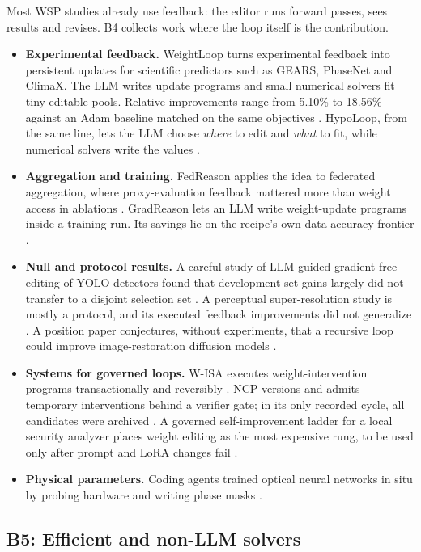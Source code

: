 Most WSP studies already use feedback: the editor runs forward passes, sees results and revises. B4 collects work where the loop itself is the contribution.
\begin{itemize}[leftmargin=*,itemsep=2pt]
\item \textbf{Experimental feedback.} WeightLoop turns experimental feedback into persistent updates for scientific predictors such as GEARS, PhaseNet and ClimaX. The LLM writes update programs and small numerical solvers fit tiny editable pools. Relative improvements range from 5.10\% to 18.56\% against an Adam baseline matched on the same objectives \citep{ax2611_07319}. HypoLoop, from the same line, lets the LLM choose \emph{where} to edit and \emph{what} to fit, while numerical solvers write the values \citep{ax2611_23718}.
\item \textbf{Aggregation and training.} FedReason applies the idea to federated aggregation, where proxy-evaluation feedback mattered more than weight access in ablations \citep{ax2611_08383}. GradReason lets an LLM write weight-update programs inside a training run. Its savings lie on the recipe's own data-accuracy frontier \citep{ax2611_11005}.
\item \textbf{Null and protocol results.} A careful study of LLM-guided gradient-free editing of YOLO detectors found that development-set gains largely did not transfer to a disjoint selection set \citep{ax2611_17789}. A perceptual super-resolution study is mostly a protocol, and its executed feedback improvements did not generalize \citep{ax2611_18690}. A position paper conjectures, without experiments, that a recursive loop could improve image-restoration diffusion models \citep{ax2611_04268}.
\item \textbf{Systems for governed loops.} W-ISA executes weight-intervention programs transactionally and reversibly \citep{ax2611_13232}. NCP versions and admits temporary interventions behind a verifier gate; in its only recorded cycle, all candidates were archived \citep{ax2611_13236}. A governed self-improvement ladder for a local security analyzer places weight editing as the most expensive rung, to be used only after prompt and LoRA changes fail \citep{ax2611_10425}.
\item \textbf{Physical parameters.} Coding agents trained optical neural networks in situ by probing hardware and writing phase masks \citep{ax2611_23875}.
\end{itemize}

\subsection{B5: Efficient and non-LLM solvers}
\label{sec:solvers}

